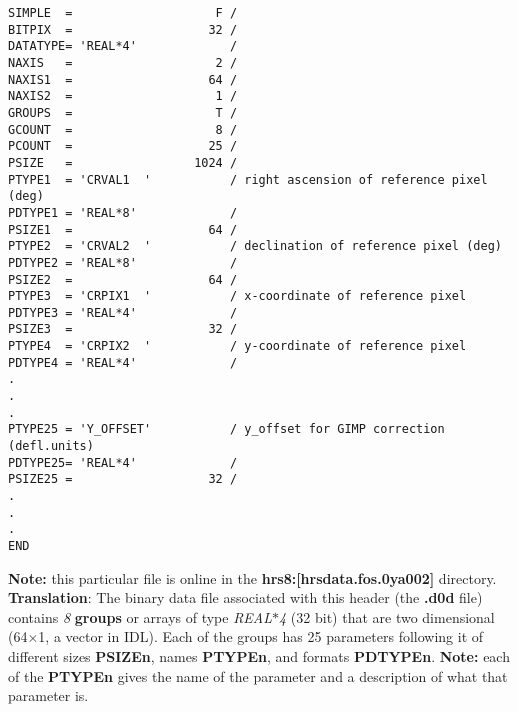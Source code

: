 \begin{scriptsize}
\begin{center}
\begin{verbatim}
SIMPLE  =                    F /                                                
BITPIX  =                   32 /                                                
DATATYPE= 'REAL*4'             /                                                
NAXIS   =                    2 /                                                
NAXIS1  =                   64 /                                                
NAXIS2  =                    1 /                                                
GROUPS  =                    T /                                                
GCOUNT  =                    8 /                                                
PCOUNT  =                   25 /                                                
PSIZE   =                 1024 /                                                
PTYPE1  = 'CRVAL1  '           / right ascension of reference pixel (deg)       
PDTYPE1 = 'REAL*8'             /                                                
PSIZE1  =                   64 /                                                
PTYPE2  = 'CRVAL2  '           / declination of reference pixel (deg)           
PDTYPE2 = 'REAL*8'             /                                                
PSIZE2  =                   64 /                                                
PTYPE3  = 'CRPIX1  '           / x-coordinate of reference pixel                
PDTYPE3 = 'REAL*4'             /                                                
PSIZE3  =                   32 /                                                
PTYPE4  = 'CRPIX2  '           / y-coordinate of reference pixel                
PDTYPE4 = 'REAL*4'             /                                                
.
.
.
PTYPE25 = 'Y_OFFSET'           / y_offset for GIMP correction (defl.units)      
PDTYPE25= 'REAL*4'             /                                                
PSIZE25 =                   32 /                                                
.
.
.
END                                                                             
\end{verbatim}
\end{center}
\end{scriptsize}

{\bf Note:} this particular file is online in the 
{\bf hrs8:[hrsdata.fos.0ya002]} directory.\\

{\bf Translation}: The binary data file associated with this 
header (the {\bf .d0d} file) contains {\it 8} {\bf groups} or arrays of type
{\it REAL$*$4} (32 bit) that are two dimensional (64$\times$1, a vector in IDL).
Each of the groups has 25 parameters following it of different sizes {\bf PSIZEn},
names {\bf PTYPEn}, and formats {\bf PDTYPEn}.  {\bf Note:} each of the
{\bf PTYPEn} gives the name of the parameter and a description of what that
parameter is.

